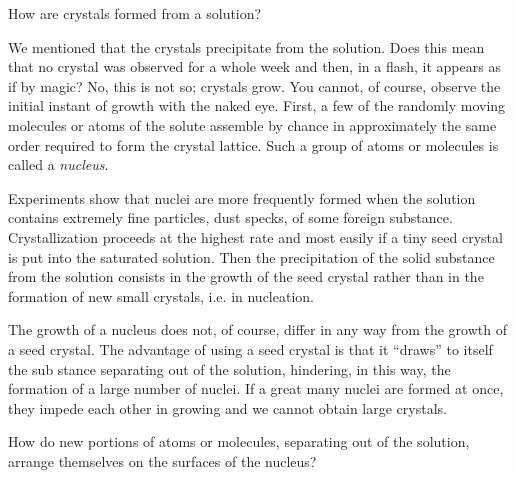 How are crystals formed from a solution?

We mentioned that the crystals precipitate from the solution. Does this mean that no crystal was observed for a whole week and then, in a flash, it appears as if by magic? No, this is not so; crystals grow. You cannot, of course, observe the initial instant of growth with the naked eye. First, a few of the randomly moving mole­cules or atoms of the solute assemble by chance in approx­imately the same order required to form the crystal lattice. Such a group of atoms or molecules is called a \emph{nucleus}.

Experiments show that nuclei are more frequently formed when the solution contains extremely fine par­ticles, dust specks, of some foreign substance. Crystalli­zation proceeds at the highest rate and most easily if a tiny seed crystal is put into the saturated solution. Then the precipitation of the solid substance from the solution consists in the growth of the seed crystal rather than in the formation of new small crystals, i.e. in nucleation.

The growth of a nucleus does not, of course, differ in any way from the growth of a seed crystal. The advantage of using a seed crystal is that it ``draws'' to itself the sub­ stance separating out of the solution, hindering, in this way, the formation of a large number of nuclei. If a great many nuclei are formed at once, they impede each other in growing and we cannot obtain large crystals.

How do new portions of atoms or molecules, separating out of the solution, arrange themselves on the surfaces of the nucleus?

